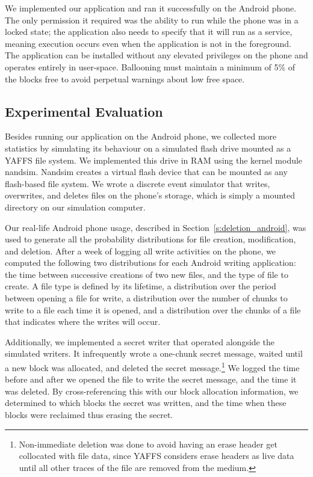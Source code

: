 \documentclass{acmtog}
\begin{document}
We implemented our application and ran it successfully on the Android
phone. The only permission it required was the ability to run while the phone
was in a locked state; the application also needs to specify that it will run as a
service, meaning execution occurs even when the application is not in the
foreground. The application can be installed without any elevated privileges
on the phone and operates entirely in user-space. Ballooning must 
maintain a minimum of 5\% of the blocks free to avoid
perpetual warnings about low free space.

\subsection{Experimental Evaluation}
Besides running our application on the Android phone, we collected more
statistics by simulating its
behaviour on a simulated flash drive mounted as a YAFFS file system. 
We implemented this drive in RAM using the kernel module
nandsim. 
Nandsim creates
a virtual flash device that can be mounted as any flash-based file system.
We wrote a discrete event
simulator that writes, overwrites, and deletes files on the phone's storage,
which is simply a mounted directory on our simulation computer.

Our real-life Android phone usage, described in
Section~\ref{s:deletion_android}, was used to generate all the probability distributions
for file creation, modification, and deletion.
 After a week of logging all
write activities on the phone, we computed the following two distributions for
each Android writing application: the time between successive creations of two new files, and
the type of file to create. A file type is defined by its lifetime, a
distribution over the period
between opening a file for write, a distribution over the number of chunks to write to a file each
time it is opened, and a distribution over the chunks of a file that indicates
where the writes will occur.

Additionally, we implemented  a secret writer that operated alongside the simulated
writers. It infrequently wrote  a one-chunk secret message,
waited until a new block was allocated, and deleted
the secret message.\footnote{Non-immediate deletion was done to avoid
having an erase
header get collocated with file data, since YAFFS considers erase headers as live data until all
  other traces of the file are removed from the medium.}  We logged the time before and
after we opened the file to write the secret message, and the time it was
deleted. By cross-referencing this with our block allocation information, we
determined to which blocks the secret was written, and the time when these
blocks were reclaimed thus erasing the secret.
\label{s:simulator}
\end{document}

